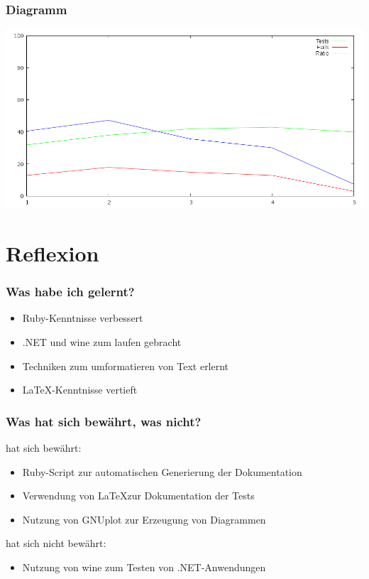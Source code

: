 \documentclass{beamer}
\begin{document}
\begin{frame}
  \frametitle{Diagramm}
  \includegraphics[width=\textwidth]{dia.png}  
\end{frame}

\section{Reflexion}
\begin{frame}
  \frametitle{Was habe ich gelernt?}
  \begin{itemize}
    \item Ruby-Kenntnisse verbessert
    \item .NET und wine zum laufen gebracht
    \item Techniken zum umformatieren von Text erlernt
    \item \LaTeX-Kenntnisse vertieft
  \end{itemize}
\end{frame}

\begin{frame}
  \frametitle{Was hat sich bewährt, was nicht?}

  hat sich bewährt:
  \begin{itemize}
  \item Ruby-Script zur automatischen Generierung der Dokumentation
  \item Verwendung von \LaTeX zur Dokumentation der Tests
  \item Nutzung von GNUplot zur Erzeugung von Diagrammen
  \end{itemize}
  \vspace{0.5cm}

  hat sich nicht bewährt:
  \begin{itemize}
  \item Nutzung von wine zum Testen von .NET-Anwendungen
  \end{itemize}
\end{frame}
\end{document}
